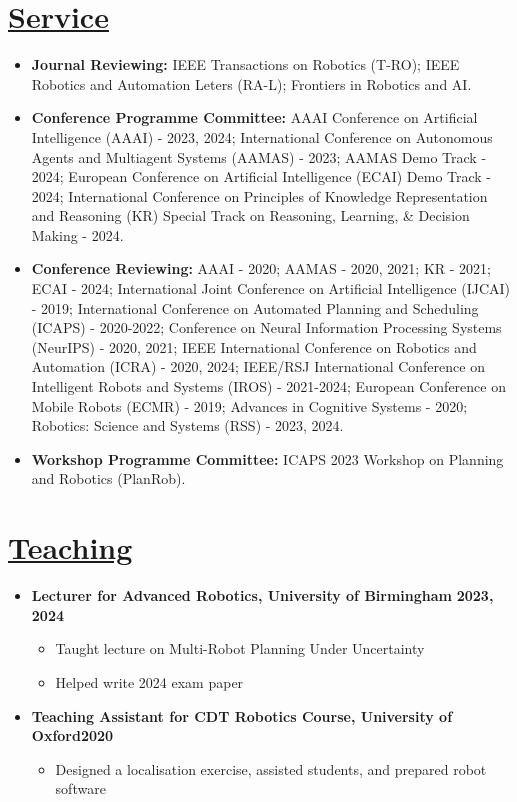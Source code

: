 \documentclass[11pt]{article}
\begin{document}
\section*{\underline{Service}}
\begin{itemize}
\item \textbf{Journal Reviewing:} IEEE Transactions on Robotics (T-RO); IEEE Robotics and Automation Leters (RA-L); Frontiers in Robotics and AI.
\item \textbf{Conference Programme Committee:}  AAAI Conference on Artificial Intelligence (AAAI) - 2023, 2024; International Conference on Autonomous Agents and Multiagent Systems (AAMAS) - 2023; AAMAS Demo Track - 2024; European Conference on Artificial Intelligence (ECAI) Demo Track - 2024; International Conference on Principles of Knowledge Representation and Reasoning (KR) Special Track on Reasoning, Learning, \& Decision Making - 2024.
\item \textbf{Conference Reviewing:} AAAI - 2020; AAMAS - 2020, 2021; KR - 2021; ECAI - 2024; International Joint Conference on Artificial Intelligence (IJCAI) - 2019; International Conference on Automated Planning and Scheduling (ICAPS) - 2020-2022; Conference on Neural Information Processing Systems (NeurIPS) - 2020, 2021; IEEE International Conference on Robotics and Automation (ICRA) - 2020, 2024; IEEE/RSJ International Conference on Intelligent Robots and Systems (IROS) - 2021-2024; European Conference on Mobile Robots (ECMR) - 2019; Advances in Cognitive Systems - 2020;  Robotics: Science and Systems (RSS) - 2023, 2024.
\item\textbf{Workshop Programme Committee:} ICAPS 2023 Workshop on Planning and Robotics (PlanRob).
\end{itemize}

\section*{\underline{Teaching}}
\begin{itemize}
\item \textbf{Lecturer for Advanced Robotics, University of Birmingham} \hfill  \textbf{2023,\,2024}
\begin{itemize}
\item Taught lecture on Multi-Robot Planning Under Uncertainty
\item Helped write 2024 exam paper
\end{itemize}
\item \textbf{Teaching Assistant for CDT Robotics Course, University of Oxford}\hfill \textbf{2020}
\begin{itemize}
\item Designed a localisation exercise, assisted students, and prepared robot software
\end{itemize}
\end{itemize}
\end{document}

